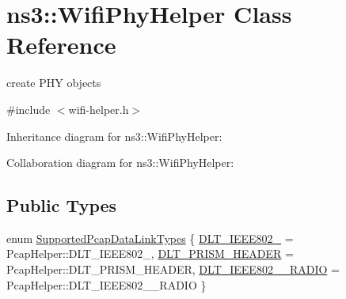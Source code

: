 \hypertarget{classns3_1_1WifiPhyHelper}{}\section{ns3\+:\+:Wifi\+Phy\+Helper Class Reference}
\label{classns3_1_1WifiPhyHelper}


create P\+HY objects  




{\ttfamily \#include $<$wifi-\/helper.\+h$>$}



Inheritance diagram for ns3\+:\+:Wifi\+Phy\+Helper\+:


Collaboration diagram for ns3\+:\+:Wifi\+Phy\+Helper\+:
\subsection*{Public Types}
\begin{DoxyCompactItemize}
\item 
enum \hyperlink{classns3_1_1WifiPhyHelper_ab5b7fd179ec894742ac15f6751d68fc1}{Supported\+Pcap\+Data\+Link\+Types} \{ \hyperlink{classns3_1_1WifiPhyHelper_ab5b7fd179ec894742ac15f6751d68fc1ab287870c1a08318981eb4a2e8f20b9f1}{D\+L\+T\+\_\+\+I\+E\+E\+E802\+\_} = Pcap\+Helper\+:\+:D\+L\+T\+\_\+\+I\+E\+E\+E802\+\_, 
\hyperlink{classns3_1_1WifiPhyHelper_ab5b7fd179ec894742ac15f6751d68fc1af1f8109d212120172df5cbce29305a0a}{D\+L\+T\+\_\+\+P\+R\+I\+S\+M\+\_\+\+H\+E\+A\+D\+ER} = Pcap\+Helper\+:\+:D\+L\+T\+\_\+\+P\+R\+I\+S\+M\+\_\+\+H\+E\+A\+D\+ER, 
\hyperlink{classns3_1_1WifiPhyHelper_ab5b7fd179ec894742ac15f6751d68fc1aefaad41088dc2cef3ecd98bcb3dd2653}{D\+L\+T\+\_\+\+I\+E\+E\+E802\+\_\+\_\+\+R\+A\+D\+IO} = Pcap\+Helper\+:\+:D\+L\+T\+\_\+\+I\+E\+E\+E802\+\_\+\_\+\+R\+A\+D\+IO
 \}
\end{DoxyCompactItemize}
